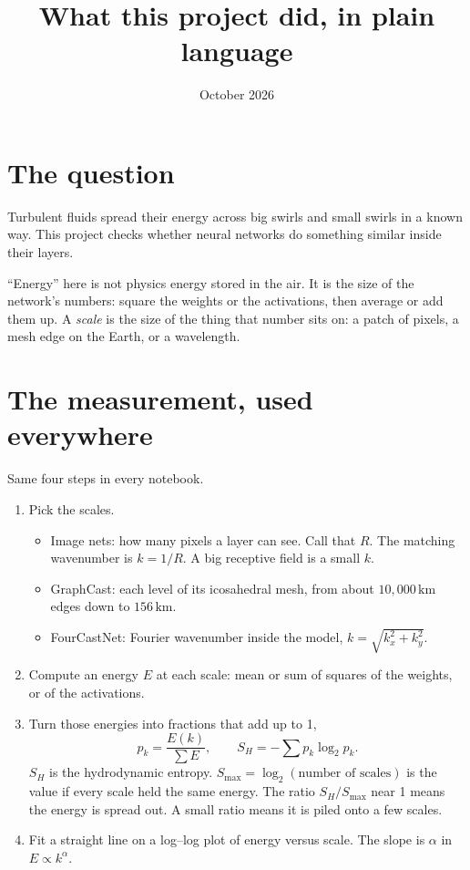 \documentclass[11pt,a4paper]{article}
\title{What this project did, in plain language}
\author{}
\date{October 2026}
\begin{document}
\maketitle

\section*{The question}

Turbulent fluids spread their energy across big swirls and small swirls in a known way.
This project checks whether neural networks do something similar inside their layers.

``Energy'' here is not physics energy stored in the air.
It is the size of the network's numbers: square the weights or the activations, then average or add them up.
A \emph{scale} is the size of the thing that number sits on: a patch of pixels, a mesh edge on the Earth, or a wavelength.

\section*{The measurement, used everywhere}

Same four steps in every notebook.

\begin{enumerate}
  \item Pick the scales.
  \begin{itemize}
    \item Image nets: how many pixels a layer can see. Call that \(R\). The matching wavenumber is \(k = 1/R\). A big receptive field is a small \(k\).
    \item GraphCast: each level of its icosahedral mesh, from about \(10{,}000\,\mathrm{km}\) edges down to \(156\,\mathrm{km}\).
    \item FourCastNet: Fourier wavenumber inside the model, \(k = \sqrt{k_x^2 + k_y^2}\).
  \end{itemize}
  \item Compute an energy \(E\) at each scale: mean or sum of squares of the weights, or of the activations.
  \item Turn those energies into fractions that add up to 1,
  \[
    p_k = \frac{E(k)}{\sum E},
    \qquad
    S_H = -\sum p_k \log_2 p_k.
  \]
  \(S_H\) is the hydrodynamic entropy. \(S_{\max} = \log_2(\text{number of scales})\) is the value if every scale held the same energy. The ratio \(S_H/S_{\max}\) near 1 means the energy is spread out. A small ratio means it is piled onto a few scales.
  \item Fit a straight line on a log--log plot of energy versus scale. The slope is \(\alpha\) in \(E \propto k^{\alpha}\).
\end{enumerate}
\end{document}
